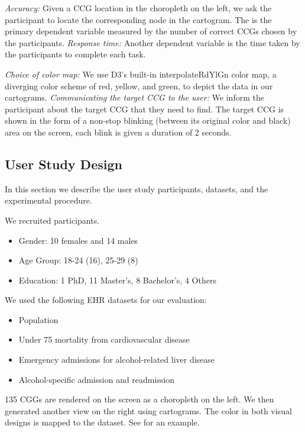 \textit{Accuracy:} Given a CCG location in the choropleth on the left, we ask the participant to locate the corresponding node in the cartogram. The is the primary dependent variable measured by the number of correct CCGs chosen by the participants. \textit{Response time:} Another dependent variable is the time taken by the participants to complete each task.

\textit{Choice of color map:} We use D3's built-in interpolateRdYlGn color map, a diverging color scheme of red, yellow, and green, to depict the data in our cartograms. \textit{Communicating the target CCG to the user:} We inform the participant about the target CCG that they need to find. The target CCG is shown in the form of a non-stop blinking (between its original color and black) area on the screen, each blink is given a duration of 2 seconds.

\subsection{User Study Design}
In this section we describe the user study participants, datasets, and the experimental procedure.

 We recruited \pCount participants.

\begin{itemize}
    \item Gender: 10 females and 14 males
    \item Age Group: 18-24 (16), 25-29 (8)
    \item Education: 1 PhD, 11 Master's, 8 Bachelor's, 4 Others
\end{itemize}

 We used the following EHR datasets for our evaluation:

\begin{itemize}
    \item Population
    \item Under 75 mortality from cardiovascular disease
    \item Emergency admissions for alcohol-related liver disease
    \item Alcohol-specific admission and readmission
\end{itemize}

135 CGGs are rendered on the screen as a choropleth on the left. We then generated another view on the right using cartograms. The color in both visual designs is mapped to the dataset. See  for an example.

